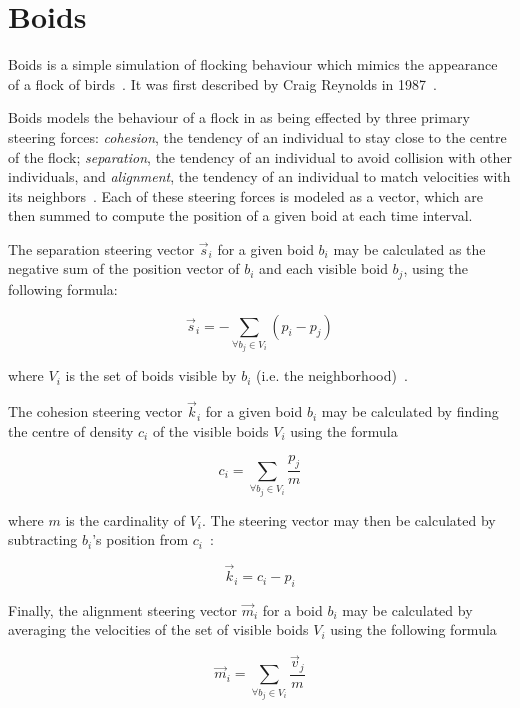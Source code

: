 

\MYHEADERS{}

\section{Boids}

Boids is a simple simulation of flocking behaviour which mimics the appearance of a flock of birds~\cite{hartman2006autonomous}. It was first described by Craig Reynolds in 1987~\cite{reynolds1987flocks}.

Boids models the behaviour of a flock in as being effected by three primary steering forces: \textit{cohesion}, the tendency of an individual to stay close to the centre of the flock; \textit{separation}, the tendency of an individual to avoid collision with other individuals, and \textit{alignment}, the tendency of an individual to match velocities with its neighbors~\cite{hartman2006autonomous,reynolds1987flocks}. Each of these steering forces is modeled as a vector, which are then summed to compute the position of a given boid at each time interval.

The separation steering vector $\vec{s}_i$ for a given boid $b_i$ may be calculated as the negative sum of the position vector of $b_i$ and each visible boid $b_j$, using the following formula:

\[ \vec{s}_i = - \sum\limits_{\forall b_j \in V_i} (p_i - p_j) \]

where $V_i$ is the set of boids visible by $b_i$ (i.e. the neighborhood)~\cite{hartman2006autonomous}.

The cohesion steering vector $\vec{k}_i$ for a given boid $b_i$ may be calculated by finding the centre of density $c_i$ of the visible boids $V_i$ using the formula

\[ c_i = \sum\limits_{\forall b_j \in V_i} \frac{p_j}{m} \]

where $m$ is the cardinality of $V_i$. The steering vector may then be calculated by subtracting $b_i$'s position from $c_i$~\cite{hartman2006autonomous}:

\[ \vec{k}_i = c_i - p_i \]

Finally, the alignment steering vector $\vec{m}_i$ for a boid $b_i$ may be calculated by averaging the velocities of the set of visible boids $V_i$ using the following formula

\[ \vec{m}_i = \sum\limits_{\forall b_j \in V_i} \frac{\vec{v}_j}{m} \]

